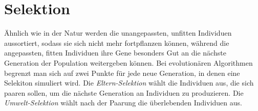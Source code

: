 



\section{Selektion}
Ähnlich wie in der Natur werden die unangepassten, unfitten Individuen aussortiert, sodass sie sich nicht mehr fortpflanzen können, während die angepassten, fitten Individuen ihre Gene besonders Gut an die nächste Generation der Population weitergeben können. Bei evolutionären Algorithmen begrenzt man sich auf zwei Punkte für jede neue Generation, in denen eine Selekiton simuliert wird. 
Die \textit{Eltern-Selektion} wählt die Individuen aus, die sich paaren sollen, um die nächste Generation an Individuen zu produzieren. Die \textit{Umwelt-Selektion} wählt nach der Paarung die überlebenden Individuen aus. 


